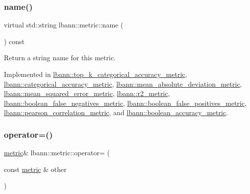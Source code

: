 \subsubsection{\texorpdfstring{name()}{name()}}
{\footnotesize\ttfamily virtual std\+::string lbann\+::metric\+::name (\begin{DoxyParamCaption}{ }\end{DoxyParamCaption}) const\hspace{0.3cm}{\ttfamily [pure virtual]}}

Return a string name for this metric. 

Implemented in \hyperlink{classlbann_1_1top__k__categorical__accuracy__metric_a7b49f722f75dabe73c0fc3500d72ef63}{lbann\+::top\+\_\+k\+\_\+categorical\+\_\+accuracy\+\_\+metric}, \hyperlink{classlbann_1_1categorical__accuracy__metric_a6fea8e495ab4ec4b05546c794468fa12}{lbann\+::categorical\+\_\+accuracy\+\_\+metric}, \hyperlink{classlbann_1_1mean__absolute__deviation__metric_a6b2f0542a991b632414dc217586db905}{lbann\+::mean\+\_\+absolute\+\_\+deviation\+\_\+metric}, \hyperlink{classlbann_1_1mean__squared__error__metric_ac5477e6104eaf87fbbe2a13232ee2d9f}{lbann\+::mean\+\_\+squared\+\_\+error\+\_\+metric}, \hyperlink{classlbann_1_1r2__metric_a66f9280c69b9b079d40b70b9c9c43ad9}{lbann\+::r2\+\_\+metric}, \hyperlink{classlbann_1_1boolean__false__negatives__metric_a7e7f60e7babfbaad2dce5def175a8fbd}{lbann\+::boolean\+\_\+false\+\_\+negatives\+\_\+metric}, \hyperlink{classlbann_1_1boolean__false__positives__metric_aa1089643938285ab8c563e5aaccf9652}{lbann\+::boolean\+\_\+false\+\_\+positives\+\_\+metric}, \hyperlink{classlbann_1_1pearson__correlation__metric_a7cbb12e258acdb0cbc4d521dc7163dd6}{lbann\+::pearson\+\_\+correlation\+\_\+metric}, and \hyperlink{classlbann_1_1boolean__accuracy__metric_a88edde5abce60809dbaaf034b166b09e}{lbann\+::boolean\+\_\+accuracy\+\_\+metric}.

\mbox{\label{classlbann_1_1metric_a4324342dab4892199a47df1d78b2cef5}} 
\subsubsection{\texorpdfstring{operator=()}{operator=()}}
{\footnotesize\ttfamily \hyperlink{classlbann_1_1metric}{metric}\& lbann\+::metric\+::operator= (\begin{DoxyParamCaption}\item[{const \hyperlink{classlbann_1_1metric}{metric} \&}]{other }\end{DoxyParamCaption})\hspace{0.3cm}{\ttfamily [default]}}

